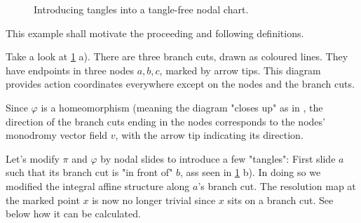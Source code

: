 \documentclass[12pt,a4paper,abstract=true,draft]{scrartcl}
\begin{document}
\begin{example}
\begin{figure}
    \caption{Introducing tangles into a tangle-free nodal chart.}
    \label{fig:building_tangles}
  \end{figure}
  This example shall motivate the proceeding and following definitions.

  Take a look at \cref{fig:building_tangles} a).
  There are three branch cuts, drawn as coloured lines.
  They have endpoints in three nodes $a,b,c$, marked by arrow tips.
  This diagram provides action coordinates everywhere except on the nodes and the branch cuts.

  Since $φ$ is a homeomorphism (meaning the diagram "closes up" as in \cite[Section 7.2]{evans2021atfs}, the direction of the branch cuts ending in the nodes corresponds to the nodes' monodromy vector field $v$, with the arrow tip indicating its direction.


  Let's modify $π$ and $φ$ by nodal slides to introduce a few "tangles": First slide $a$ such that its branch cut is "in front of" $b$, ass seen in \cref{fig:building_tangles} b).
  In doing so we modified the integral affine structure along $a$'s branch cut. 
  The resolution map at the marked point $x$ is now no longer trivial since $x$ sits on a branch cut.
  See below how it can be calculated.


\end{example}
\end{document}
